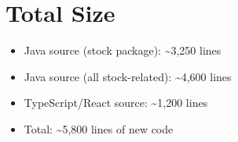 \documentclass[12pt,a4paper]{report}
\begin{document}
\section{Total Size}

\begin{itemize}
\item Java source (stock package): \textasciitilde3,250 lines
\item Java source (all stock-related): \textasciitilde4,600 lines
\item TypeScript/React source: \textasciitilde1,200 lines
\item Total: \textasciitilde5,800 lines of new code
\end{itemize}
\end{document}
